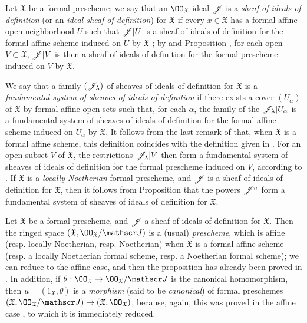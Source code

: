 \begin{env}[10.5.1]
\label{1.10.5.1}
Let $\mathfrak{X}$ be a formal prescheme; we say that an $\OO_\mathfrak{X}$-ideal $\mathscr{J}$ is a \emph{sheaf of ideals of definition} (or an \emph{ideal sheaf of definition}) for $\mathfrak{X}$ if every $x\in\mathfrak{X}$ has a formal affine open neighborhood $U$ such that $\mathscr{J}|U$ is a sheaf of ideals of definition for the formal affine scheme induced on $U$ by $\mathfrak{X}$ ; by  and Proposition , for each open $V\subset\mathfrak{X}$, $\mathscr{J}|V$ is then a sheaf of ideals of definition for the formal prescheme induced on $V$ by $\mathfrak{X}$.

We say that a family $(\mathscr{J}_\lambda)$ of sheaves of ideals of definition for $\mathfrak{X}$ is a \emph{fundamental system}
\emph{of sheaves of ideals of definition} if there exists a cover $(U_\alpha)$ of $\mathfrak{X}$ by formal affine open sets such that, for each $\alpha$, the family of the $\mathscr{J}_\lambda|U_\alpha$ is a fundamental system of sheaves of ideals of definition  for the formal affine scheme induced on $U_\alpha$ by $\mathfrak{X}$.
It follows from the last remark of  that, when $\mathfrak{X}$ is a formal affine scheme, this definition coincides with the definition given in .
For an open subset $V$ of $\mathfrak{X}$, the restrictions $\mathscr{J}_\lambda|V$ then form a fundamental system of sheaves of ideals of definition for the formal prescheme induced on $V$, according to .
If $\mathfrak{X}$ is a \emph{locally Noetherian} formal prescheme, and $\mathscr{J}$ is a sheaf of ideals of definition for $\mathfrak{X}$, then it follows from Proposition  that the powers $\mathscr{J}^n$ form a fundamental system of sheaves of ideals of definition for $\mathfrak{X}$.
\end{env}

\begin{env}[10.5.2]
\label{1.10.5.2}
Let $\mathfrak{X}$ be a formal prescheme, and $\mathscr{J}$ a sheaf of ideals of definition for $\mathfrak{X}$.
Then the ringed space $(\mathfrak{X},\OO_\mathfrak{X}/\sh{J})$ is a (usual) \emph{prescheme}, which is affine (resp. locally Noetherian, resp. Noetherian) when $\mathfrak{X}$ is a formal affine scheme (resp. a locally Noetherian formal scheme, resp. a Noetherian formal scheme);  we can reduce to the affine case, and then the proposition has already been proved in .
In addition, if $\theta:\OO_\mathfrak{X}\to\OO_\mathfrak{X}/\sh{J}$ is the canonical homomorphism, then $u=(1_\mathfrak{X},\theta)$ is a \emph{morphism} (said to be \emph{canonical}) of formal preschemes $(\mathfrak{X},\OO_\mathfrak{X}/\sh{J})\to(\mathfrak{X},\OO_\mathfrak{X})$, because, again, this was proved in the affine case , to which it is immediately reduced.
\end{env}

